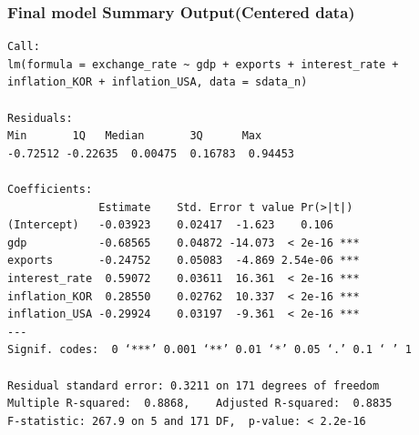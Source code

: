 \documentclass[12pt]{article}
\begin{document}
\subsubsection{Final model Summary Output(Centered data)}
\label{centered}

\begin{verbatim}
Call:
lm(formula = exchange_rate ~ gdp + exports + interest_rate + 
inflation_KOR + inflation_USA, data = sdata_n)

Residuals:
Min       1Q   Median       3Q      Max 
-0.72512 -0.22635  0.00475  0.16783  0.94453 

Coefficients:
              Estimate    Std. Error t value Pr(>|t|)    
(Intercept)   -0.03923    0.02417  -1.623    0.106    
gdp           -0.68565    0.04872 -14.073  < 2e-16 ***
exports       -0.24752    0.05083  -4.869 2.54e-06 ***
interest_rate  0.59072    0.03611  16.361  < 2e-16 ***
inflation_KOR  0.28550    0.02762  10.337  < 2e-16 ***
inflation_USA -0.29924    0.03197  -9.361  < 2e-16 ***
---
Signif. codes:  0 ‘***’ 0.001 ‘**’ 0.01 ‘*’ 0.05 ‘.’ 0.1 ‘ ’ 1

Residual standard error: 0.3211 on 171 degrees of freedom
Multiple R-squared:  0.8868,	Adjusted R-squared:  0.8835 
F-statistic: 267.9 on 5 and 171 DF,  p-value: < 2.2e-16
\end{verbatim}
\end{document}
